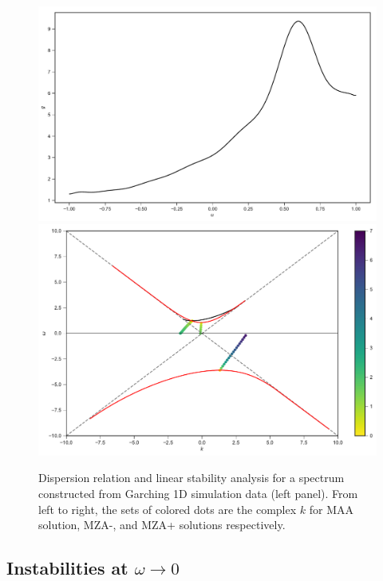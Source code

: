 \documentclass[%
preprint,
 amsmath,amssymb,
 aps,
 prd
]{revtex4-1}
\begin{document}
\begin{figure}
     \includegraphics[width=\linewidth]{assets/spectGarchingPlt.pdf}
   \endminipage\hfill
   \includegraphics[width=\linewidth]{assets/spectGarchingDRLSAPlt.pdf}
   \endminipage\hfill
   \caption{Dispersion relation and linear stability analysis for a spectrum constructed from Garching 1D simulation data (left panel). From left to right, the sets of colored dots are the complex $k$ for MAA solution, MZA-, and MZA+ solutions respectively.
    }
   \label{fig-garching}
\end{figure}




\subsection{\label{sec-omega-to-zero}Instabilities at $\omega\to 0$}
\end{document}
